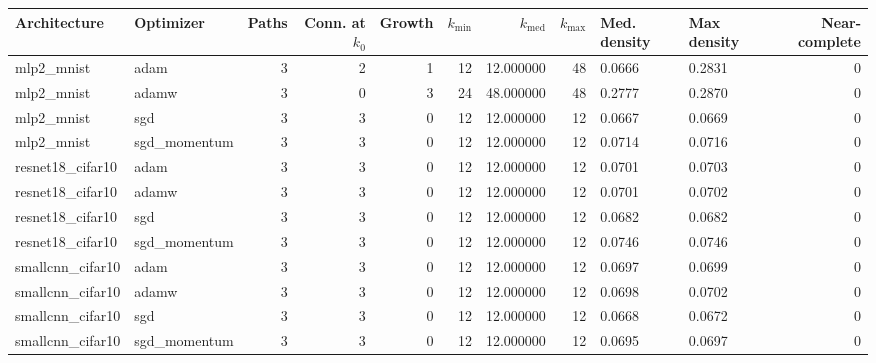 \begin{tabular}{llrrrrrrllr}
\toprule
Architecture & Optimizer & Paths & Conn. at $k_0$ & Growth & $k_{\min}$ & $k_{\mathrm{med}}$ & $k_{\max}$ & Med. density & Max density & Near-complete \\
\midrule
mlp2_mnist & adam & 3 & 2 & 1 & 12 & 12.000000 & 48 & 0.0666 & 0.2831 & 0 \\
mlp2_mnist & adamw & 3 & 0 & 3 & 24 & 48.000000 & 48 & 0.2777 & 0.2870 & 0 \\
mlp2_mnist & sgd & 3 & 3 & 0 & 12 & 12.000000 & 12 & 0.0667 & 0.0669 & 0 \\
mlp2_mnist & sgd_momentum & 3 & 3 & 0 & 12 & 12.000000 & 12 & 0.0714 & 0.0716 & 0 \\
resnet18_cifar10 & adam & 3 & 3 & 0 & 12 & 12.000000 & 12 & 0.0701 & 0.0703 & 0 \\
resnet18_cifar10 & adamw & 3 & 3 & 0 & 12 & 12.000000 & 12 & 0.0701 & 0.0702 & 0 \\
resnet18_cifar10 & sgd & 3 & 3 & 0 & 12 & 12.000000 & 12 & 0.0682 & 0.0682 & 0 \\
resnet18_cifar10 & sgd_momentum & 3 & 3 & 0 & 12 & 12.000000 & 12 & 0.0746 & 0.0746 & 0 \\
smallcnn_cifar10 & adam & 3 & 3 & 0 & 12 & 12.000000 & 12 & 0.0697 & 0.0699 & 0 \\
smallcnn_cifar10 & adamw & 3 & 3 & 0 & 12 & 12.000000 & 12 & 0.0698 & 0.0702 & 0 \\
smallcnn_cifar10 & sgd & 3 & 3 & 0 & 12 & 12.000000 & 12 & 0.0668 & 0.0672 & 0 \\
smallcnn_cifar10 & sgd_momentum & 3 & 3 & 0 & 12 & 12.000000 & 12 & 0.0695 & 0.0697 & 0 \\
\bottomrule
\end{tabular}
